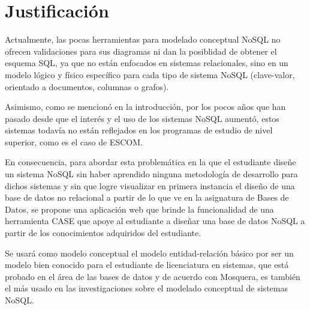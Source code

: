 \section{Justificación}

Actualmente, las pocas herramientas para modelado conceptual NoSQL no ofrecen validaciones para sus diagramas ni dan la posiblidad de obtener el esquema SQL, ya que no están enfocados en sistemas relacionales, sino en un modelo lógico y físico específico para cada tipo de sistema NoSQL (clave-valor, orientado a documentos, columnas o grafos).


Asimismo, como se mencionó en la introducción, por los pocos años que han pasado desde que el interés y el uso de los sistemas NoSQL aumentó, estos sistemas todavía no están reflejados en los programas de estudio de nivel superior, como es el caso de ESCOM.


En consecuencia, para abordar esta problemática en la que el estudiante diseñe un sistema NoSQL sin haber aprendido ninguna metodología de desarrollo para dichos sistemas y sin que logre visualizar en primera instancia el diseño de una base de datos no relacional a partir de lo que ve en la asignatura de Bases de Datos, se propone una aplicación web que brinde la funcionalidad de una herramienta CASE que apoye al estudiante a diseñar una base de datos NoSQL a partir de los conocimientos adquiridos del estudiante.


Se usará como modelo conceptual el modelo entidad-relación básico por ser un modelo bien conocido para el estudiante de licenciatura en sistemas, que está probado en el área de las bases de datos y de acuerdo con Mosquera\cite{martinez-mosquera_modeling_2020}, es también el más usado en las investigaciones sobre el modelado conceptual de sistemas NoSQL.

